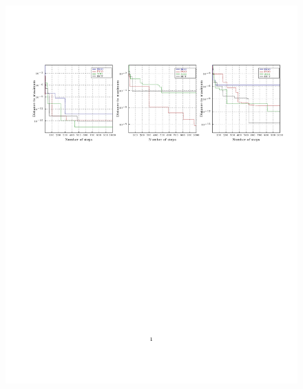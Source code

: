 \documentclass[a4paper,10pt]{article}
\begin{document}
\vspace*{-20cm}
\begin{figure}
\hspace{-5cm}
\includegraphics[trim={0 6cm 0 4cm},clip]{best1000_01.pdf}\\
\end{figure}
\end{document}

